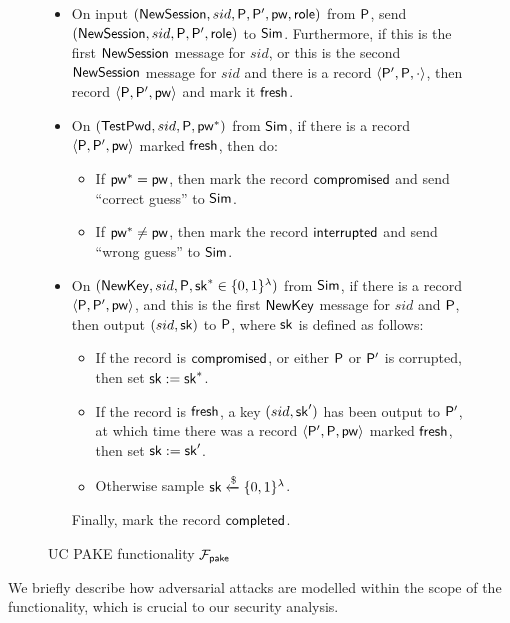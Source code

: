 	\begin{figure}[tbp]
		\begin{framed}\small
			\begin{itemize}
				\item On input $(\mathsf{NewSession}, sid, \mathsf{P}, \mathsf{P}', \mathsf{pw}, \mathsf{role})$ from $\mathsf{P}$, send $(\mathsf{NewSession},\allowbreak sid,\allowbreak \mathsf{P},\allowbreak \mathsf{P}',\allowbreak \mathsf{role})$ to $\mathsf{Sim}$. Furthermore, if this is the first $\mathsf{NewSession}$ message for $sid$, or this is the second $\mathsf{NewSession}$ message for $sid$ and there is a record $\left<\mathsf{P}', \mathsf{P}, \cdot\right>$, then record $\left<\mathsf{P}, \mathsf{P}', \mathsf{pw}\right>$ and mark it $\mathsf{fresh}$.
				\item On $(\mathsf{TestPwd}, sid, \mathsf{P}, \mathsf{pw}^*)$ from $\mathsf{Sim}$, if there is a record $\left<\mathsf{P}, \mathsf{P}', \mathsf{pw}\right>$ marked $\mathsf{fresh}$, then do:
				\begin{itemize}
					\item If $\mathsf{pw}^* = \mathsf{pw}$, then mark the record $\mathsf{compromised}$ and send ``correct guess'' to $\mathsf{Sim}$.
					\item If $\mathsf{pw}^* \neq \mathsf{pw}$, then mark the record $\mathsf{interrupted}$ and send ``wrong guess'' to $\mathsf{Sim}$.
				\end{itemize}
				\item On $(\mathsf{NewKey}, sid, \mathsf{P}, \mathsf{sk}^* \in \{0,1\}^\lambda)$ from $\mathsf{Sim}$, if there is a record $\left<\mathsf{P}, \mathsf{P}', \mathsf{pw}\right>$, and this is the first $\mathsf{NewKey}$ message for $sid$ and $\mathsf{P}$, then output $(sid, \mathsf{sk})$ to $\mathsf{P}$, where $\mathsf{sk}$ is defined as follows:
				\begin{itemize}
					\item If the record is $\mathsf{compromised}$, or either $\mathsf{P}$ or $\mathsf{P}'$ is corrupted, then set $\mathsf{sk} := \mathsf{sk}^*$.
					\item If the record is $\mathsf{fresh}$, a key $(sid, \mathsf{sk}')$ has been output to $\mathsf{P}'$, at which time there was a record $\left<\mathsf{P}', \mathsf{P}, \mathsf{pw}\right>$ marked $\mathsf{fresh}$, then set $\mathsf{sk} := \mathsf{sk}'$.
					\item Otherwise sample $\mathsf{sk} \xleftarrow{\$} \{0,1\}^\lambda$.
				\end{itemize}
				Finally, mark the record $\mathsf{completed}$.
			\end{itemize}
		\end{framed}
		\caption{UC PAKE functionality $\mathcal{F}_{\mathsf{pake}}$}
		\label{fig:pake-functionality}
	\end{figure}
	
	We briefly describe how adversarial attacks are modelled within the scope of the functionality, which is crucial to our security analysis.
	
